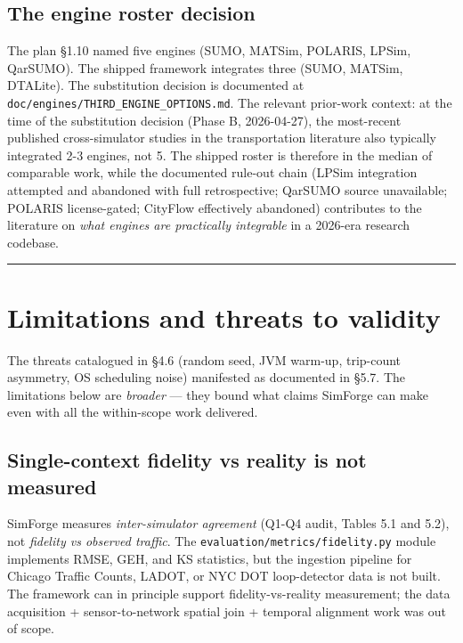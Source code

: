 \subsection{The engine roster
decision}\label{633-the-engine-roster-decision}

The plan §1.10 named five engines (SUMO, MATSim, POLARIS, LPSim,
QarSUMO). The shipped framework integrates three (SUMO, MATSim,
DTALite). The substitution decision is documented at
\texttt{doc/engines/THIRD\_ENGINE\_OPTIONS.md}. The relevant prior-work
context: at the time of the substitution decision (Phase B, 2026-04-27),
the most-recent published cross-simulator studies in the transportation
literature also typically integrated 2-3 engines, not 5. The shipped
roster is therefore in the median of comparable work, while the
documented rule-out chain (LPSim integration attempted and abandoned
with full retrospective; QarSUMO source unavailable; POLARIS
license-gated; CityFlow effectively abandoned) contributes to the
literature on \emph{what engines are practically integrable} in a
2026-era research codebase.

\begin{center}\rule{0.5\linewidth}{0.5pt}\end{center}

\section{Limitations and threats to
validity}\label{64-limitations-and-threats-to-validity}

The threats catalogued in §4.6 (random seed, JVM warm-up, trip-count
asymmetry, OS scheduling noise) manifested as documented in §5.7. The
limitations below are \emph{broader} --- they bound what claims SimForge
can make even with all the within-scope work delivered.

\subsection{Single-context fidelity vs reality is not
measured}\label{641-single-context-fidelity-vs-reality-is-not-measured}

SimForge measures \emph{inter-simulator agreement} (Q1-Q4 audit, Tables
5.1 and 5.2), not \emph{fidelity vs observed traffic}. The
\texttt{evaluation/metrics/fidelity.py} module implements RMSE, GEH, and
KS statistics, but the ingestion pipeline for Chicago Traffic Counts,
LADOT, or NYC DOT loop-detector data is not built. The framework can in
principle support fidelity-vs-reality measurement; the data acquisition
+ sensor-to-network spatial join + temporal alignment work was out of
scope.

